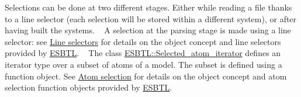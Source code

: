 Selections can be done at two different stages. Either while reading a file thanks to a line selector (each selection will be stored within a different system), or after having built the systems. ~\newline
A selection at the parsing stage is made using a line selector\+: see \hyperlink{group__linesel}{Line selectors} for details on the object concept and line selectors provided by \hyperlink{namespaceESBTL}{E\+S\+B\+TL}. ~\newline
The class \hyperlink{classESBTL_1_1Selected__atom__iterator}{E\+S\+B\+T\+L\+::\+Selected\+\_\+atom\+\_\+iterator} defines an iterator type over a subset of atoms of a model. The subset is defined using a function object. See \hyperlink{group__atomsel}{Atom selection} for details on the object concept and atom selection function objects provided by \hyperlink{namespaceESBTL}{E\+S\+B\+TL}. 